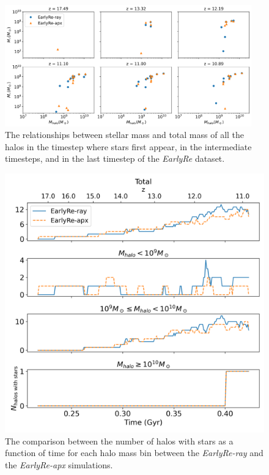 \documentclass[linenumbers, twocolumn]{aastex631}
\begin{document}
\begin{figure}
    \centering
    \includegraphics[width=0.95\textwidth]{EarlyRe/stellarmass_totalmass_EarlyRe_starassignment.png}
    \caption{The relationships between stellar mass and total mass of all the halos in the timestep where stars first appear, in the intermediate timesteps, and in the last timestep of the \textit{EarlyRe} dataset.}
    \label{fig:SFR_stellar_total_EarlyRe}
\end{figure}
\begin{figure}
    \centering
    \includegraphics[width=0.95\columnwidth]{EarlyRe/number_of_halo_wstars.png}
    \caption{The comparison between the number of halos with stars as a function of time for each halo mass bin between the \textit{EarlyRe-ray} and the \textit{EarlyRe-apx} simulations.}
    \label{fig:number_halowstars_vs_time_EarlyRe}
\end{figure}
\end{document}
